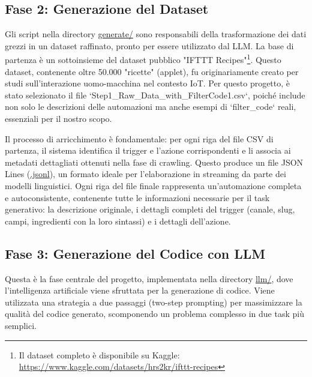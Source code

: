 \documentclass[sigconf,natbib=false]{acmart}
\begin{document}
\subsection{Fase 2: Generazione del Dataset}
Gli script nella directory \url{generate/} sono responsabili della trasformazione dei dati grezzi in un dataset raffinato, pronto per essere utilizzato dal LLM. La base di partenza è un sottoinsieme del dataset pubblico "IFTTT Recipes"\footnote{Il dataset completo è disponibile su Kaggle: \url{https://www.kaggle.com/datasets/hrs2kr/ifttt-recipes}}. Questo dataset, contenente oltre 50.000 "ricette" (applet), fu originariamente creato per studi sull'interazione uomo-macchina nel contesto IoT. Per questo progetto, è stato selezionato il file `Step1_Raw_Data_with_FilterCode1.csv`, poiché include non solo le descrizioni delle automazioni ma anche esempi di `filter_code` reali, essenziali per il nostro scopo.

Il processo di arricchimento è fondamentale: per ogni riga del file CSV di partenza, il sistema identifica il trigger e l'azione corrispondenti e li associa ai metadati dettagliati ottenuti nella fase di crawling. Questo produce un file JSON Lines (\url{.jsonl}), un formato ideale per l'elaborazione in streaming da parte dei modelli linguistici. Ogni riga del file finale rappresenta un'automazione completa e autoconsistente, contenente tutte le informazioni necessarie per il task generativo: la descrizione originale, i dettagli completi del trigger (canale, slug, campi, ingredienti con la loro sintassi) e i dettagli dell'azione.

\subsection{Fase 3: Generazione del Codice con LLM}
Questa è la fase centrale del progetto, implementata nella directory \url{llm/}, dove l'intelligenza artificiale viene sfruttata per la generazione di codice. Viene utilizzata una strategia a due passaggi (two-step prompting) per massimizzare la qualità del codice generato, scomponendo un problema complesso in due task più semplici.
\end{document}
